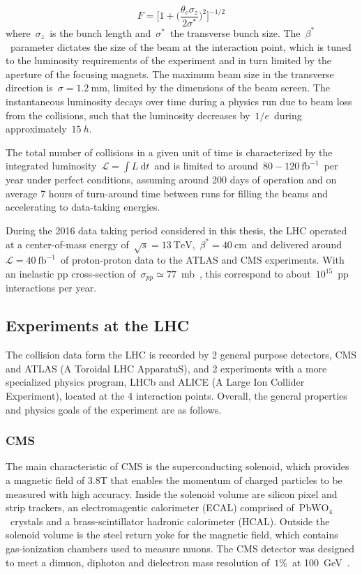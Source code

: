 \begin{equation}
F = \biggl[1 + \bigr( \frac{\theta_c \sigma_z}{2 \sigma^*} \bigr)^2 \biggr]^{-1/2}
\end{equation}
where~$\sigma_z$~is the bunch length and~$\sigma^*$~the transverse bunch size. The~$\beta^*$~parameter dictates the size of the beam at the interaction point, which is tuned to the luminosity requirements of the experiment and in turn limited by the aperture of the focusing magnets. The maximum beam size in the transverse direction is~$\sigma=1.2~\mathrm{mm}$, limited by the dimensions of the beam screen. The instantaneous luminosity decays over time during a physics run due to beam loss from the collisions, such that the luminosity decreases by~$1/e$~during approximately~$15\ h$.

The total number of collisions in a given unit of time is characterized by the integrated luminosity~$\mathcal{L} = \int L\ \mathrm{d}t$~and is limited to around~$80-120~\mathrm{fb}^{-1}$~per year under perfect conditions, assuming around 200 days of operation and on average 7 hours of turn-around time between runs for filling the beams and accelerating to data-taking energies.

During the 2016 data taking period considered in this thesis, the LHC operated at a center-of-mass energy of~$\sqrt{s} = 13~\mathrm{TeV}$,~$\beta^* = 40~\mathrm{cm}$~and delivered around~$\mathcal{L} = 40~\mathrm{fb}^{-1}$~of proton-proton data to the ATLAS and CMS experiments. With an inelastic pp cross-section of~$\sigma_{pp} \simeq 77$~mb~\cite{VanHaevermaet:2016gnh}, this correspond to about~$10^{15}$~pp interactions per year.

\subsection{Experiments at the LHC}
The collision data form the LHC is recorded by 2 general purpose detectors, CMS and ATLAS (A Toroidal LHC ApparatuS), and 2 experiments with a more specialized physics program, LHCb and ALICE (A Large Ion Collider Experiment), located at the 4 interaction points. Overall, the general properties and physics goals of the experiment are as follows.

\subsubsection{CMS}
The main characteristic of CMS is the superconducting solenoid, which provides a magnetic field of 3.8T that enables the momentum of charged particles to be measured with high accuracy. Inside the solenoid volume are silicon pixel and strip trackers, an electromagentic calorimeter (ECAL) comprised of~$\mathrm{PbWO}_4$~crystals and a brass-scintillator hadronic calorimeter (HCAL). Outside the solenoid volume is the steel return yoke for the magnetic field, which contains gas-ionization chambers used to measure muons. The CMS detector was designed to meet a dimuon, diphoton and dielectron mass resolution of~$1\%$~at 100~GeV~\cite{Chatrchyan:2008aa}.

